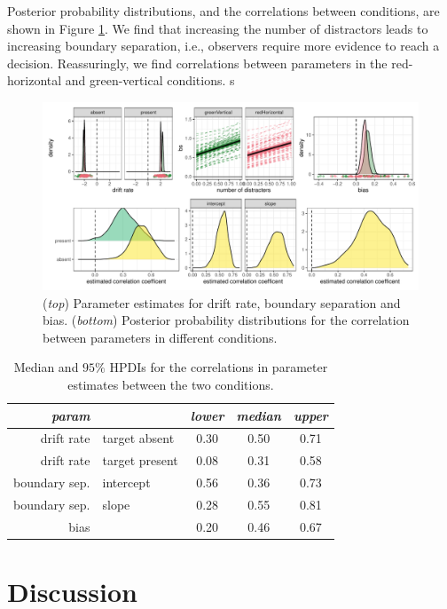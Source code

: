 \documentclass[11pt, twoside, twocolumn]{article}
\begin{document}
Posterior probability distributions, and the correlations between conditions, are shown in Figure \ref{fig:lvl3_params}. We find that increasing the number of distractors leads to increasing boundary separation, i.e., observers require more evidence to reach a decision. Reassuringly, we find correlations between parameters in the red-horizontal and green-vertical conditions. s

\begin{figure}
\centering
\includegraphics[width=\linewidth]{figs/exp_lvl_3_model_params.pdf}
\caption{(\textit{top}) Parameter estimates for drift rate, boundary separation and bias. (\textit{bottom}) Posterior probability distributions for the correlation between parameters in different conditions.}
\label{fig:lvl3_params}
\end{figure}


\begin{table}[]
\begin{tabular}{rl|ccc}
\textit{param}               &                & \textit{lower} & \textit{median} & \textit{upper} \\
\hline
drift rate          & target absent  & 0.30  & 0.50   & 0.71  \\
drift rate          & target present & 0.08  & 0.31   & 0.58  \\
boundary sep. & intercept      & 0.56  & 0.36   & 0.73  \\
boundary sep. & slope          & 0.28  & 0.55   & 0.81  \\
bias                &                & 0.20  & 0.46   & 0.67  \\
\end{tabular}
\caption{Median and $95\%$ HPDIs for the correlations in parameter estimates between the two conditions.}
\label{tab:lvl3}
\end{table}


\section{Discussion}
\end{document}
